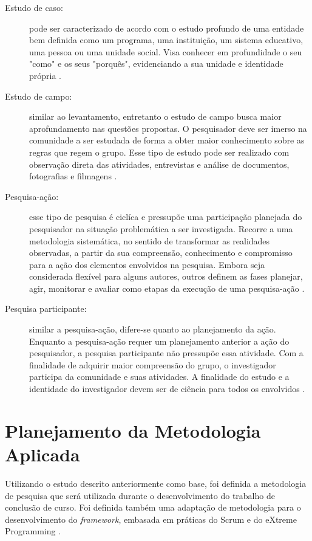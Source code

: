 \begin{description}
\item[Estudo de caso:] pode ser caracterizado de acordo com o estudo profundo de uma entidade bem definida como um programa, uma instituição, um sistema educativo, uma pessoa ou uma unidade social. Visa conhecer em profundidade o seu "como" e os seus "porquês", evidenciando a sua unidade e identidade própria \cite{prodanov2013}. 

\item[Estudo de campo:] similar ao levantamento, entretanto o estudo de campo busca maior aprofundamento nas questões propostas. O pesquisador deve ser imerso na comunidade a ser estudada de forma a obter maior conhecimento sobre as regras que regem o grupo. Esse tipo de estudo pode ser realizado com observação direta das atividades, entrevistas e análise de documentos, fotografias e filmagens \cite{tafner2007}.

\item[Pesquisa-ação:] esse tipo de pesquisa é ciclíca e pressupõe uma participação planejada do pesquisador na situação problemática a ser investigada. Recorre a uma metodologia sistemática, no sentido de transformar as realidades observadas, a partir da sua compreensão, conhecimento e compromisso para a ação dos elementos envolvidos na pesquisa\cite{thiollent2009}. Embora seja considerada flexível para alguns autores, outros definem as fases planejar, agir, monitorar e avaliar como etapas da execução de uma pesquisa-ação \cite{ferreira2011}. 

\item[Pesquisa participante:] similar a pesquisa-ação, difere-se quanto ao planejamento da ação. Enquanto a pesquisa-ação requer um planejamento anterior a ação do pesquisador, a pesquisa participante não pressupõe essa atividade. Com a finalidade de adquirir maior compreensão do grupo, o investigador participa da comunidade e suas atividades. A finalidade do estudo e a identidade do investigador devem ser de ciência para todos os envolvidos \cite{tafner2007}.
\end{description}

 \section{Planejamento da Metodologia Aplicada}
  
Utilizando o estudo descrito anteriormente como base, foi definida a metodologia de pesquisa que será utilizada durante o desenvolvimento do trabalho de conclusão de curso.  Foi definida também uma adaptação de metodologia para o desenvolvimento do \textit{framework}, embasada em práticas do Scrum \cite{scrum2014} e do eXtreme Programming \cite{wells2009}.  
  
